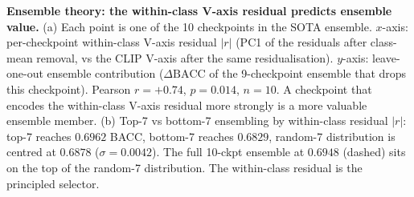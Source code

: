 \textbf{Ensemble theory: the within-class V-axis residual predicts ensemble value.}
(a) Each point is one of the 10 checkpoints in the SOTA ensemble.
$x$-axis: per-checkpoint within-class V-axis residual $|r|$ (PC1 of the residuals after class-mean removal, vs the CLIP V-axis after the same residualisation).
$y$-axis: leave-one-out ensemble contribution ($\Delta\mathrm{BACC}$ of the 9-checkpoint ensemble that drops this checkpoint).
Pearson $r{=}{+}0.74$, $p{=}0.014$, $n{=}10$.
A checkpoint that encodes the within-class V-axis residual more strongly is a more valuable ensemble member.
(b) Top-7 vs bottom-7 ensembling by within-class residual $|r|$: top-7 reaches $0.6962$ BACC, bottom-7 reaches $0.6829$, random-7 distribution is centred at $0.6878$ ($\sigma{=}0.0042$).
The full 10-ckpt ensemble at $0.6948$ (dashed) sits on the top of the random-7 distribution.
The within-class residual is the principled selector.
